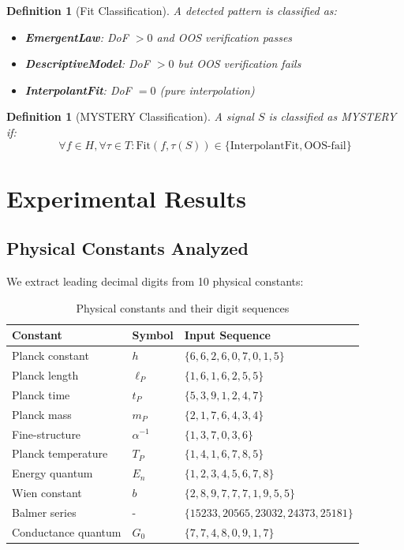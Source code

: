 \documentclass[11pt,a4paper]{article}
\newtheorem{definition}[theorem]{Definition}
\begin{document}
\begin{definition}[Fit Classification]
A detected pattern is classified as:
\begin{itemize}
    \item \textbf{EmergentLaw}: DoF $> 0$ and OOS verification passes
    \item \textbf{DescriptiveModel}: DoF $> 0$ but OOS verification fails
    \item \textbf{InterpolantFit}: DoF $= 0$ (pure interpolation)
\end{itemize}
\end{definition}

\begin{definition}[MYSTERY Classification]
A signal $S$ is classified as MYSTERY if:
\begin{equation}
    \forall f \in H, \forall \tau \in T: \text{Fit}(f, \tau(S)) \in \{\text{InterpolantFit}, \text{OOS-fail}\}
\end{equation}
\end{definition}

\section{Experimental Results}
\label{sec:results}

\subsection{Physical Constants Analyzed}

We extract leading decimal digits from 10 physical constants:

\begin{table}[h]
\centering
\caption{Physical constants and their digit sequences}
\label{tab:input}
\begin{tabular}{@{}llp{5cm}@{}}
\toprule
Constant & Symbol & Input Sequence \\
\midrule
Planck constant & $h$ & $\{6, 6, 2, 6, 0, 7, 0, 1, 5\}$ \\
Planck length & $\ell_P$ & $\{1, 6, 1, 6, 2, 5, 5\}$ \\
Planck time & $t_P$ & $\{5, 3, 9, 1, 2, 4, 7\}$ \\
Planck mass & $m_P$ & $\{2, 1, 7, 6, 4, 3, 4\}$ \\
Fine-structure & $\alpha^{-1}$ & $\{1, 3, 7, 0, 3, 6\}$ \\
Planck temperature & $T_P$ & $\{1, 4, 1, 6, 7, 8, 5\}$ \\
Energy quantum & $E_n$ & $\{1, 2, 3, 4, 5, 6, 7, 8\}$ \\
Wien constant & $b$ & $\{2, 8, 9, 7, 7, 7, 1, 9, 5, 5\}$ \\
Balmer series & - & $\{15233, 20565, 23032, 24373, 25181\}$ \\
Conductance quantum & $G_0$ & $\{7, 7, 4, 8, 0, 9, 1, 7\}$ \\
\bottomrule
\end{tabular}
\end{table}
\end{document}
